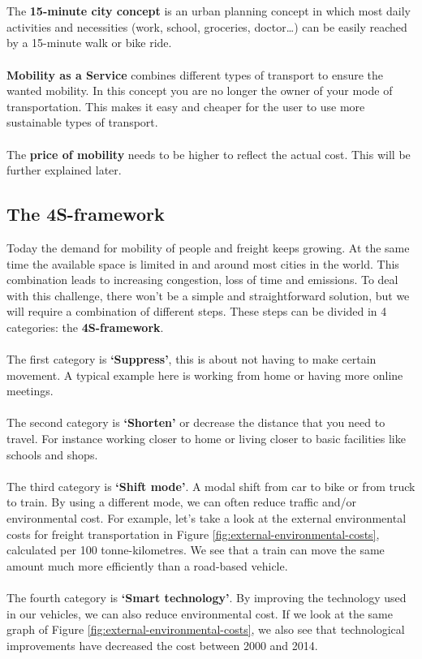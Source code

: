 \documentclass[../summary.tex]{subfiles}
\begin{document}
	\\\\
	The \textbf{15-minute city concept} is an urban planning concept in which most daily activities and necessities (work, school, groceries, doctor…) can be easily reached by a 15-minute walk or bike ride.
	\\\\
	\textbf{Mobility as a Service} combines different types of transport to ensure the wanted mobility. In this concept you are no longer the owner of your mode of transportation. This makes it easy and cheaper for the user to use more sustainable types of transport.
	\\\\
	The \textbf{price of mobility} needs to be higher to reflect the actual cost. This will be further explained later. 
	
	\newpage
	\subsection{The 4S-framework}
	
	Today the demand for mobility of people and freight keeps growing. At the same time the available space is limited in and around most cities in the world. This combination leads to increasing congestion, loss of time and emissions. To deal with this challenge, there won't be a simple and straightforward solution, but we will require a combination of different steps. These steps can be divided in 4 categories: the \textbf{4S-framework}.
	\\\\
	The first category is \textbf{`Suppress'}, this is about not having to make certain movement. A typical example here is working from home or having more online meetings.
	\\\\
	The second category is \textbf{`Shorten'} or decrease the distance that you need to travel. For instance working closer to home or living closer to basic facilities like schools and shops.
	\\\\
	The third category is \textbf{`Shift mode'}. A modal shift from car to bike or from truck to train. By using a different mode, we can often reduce traffic and/or environmental cost. For example, let's take a look at the external environmental costs for freight transportation in Figure \ref{fig:external-environmental-costs}, calculated per 100 tonne-kilometres. We see that a train can move the same amount much more efficiently than a road-based vehicle.
	\\\\	
	The fourth category is \textbf{`Smart technology'}. By improving the technology used in our vehicles, we can also reduce environmental cost. If we look at the same graph of Figure \ref{fig:external-environmental-costs}, we also see that technological improvements have decreased the cost between 2000 and 2014.
	
\end{document}
